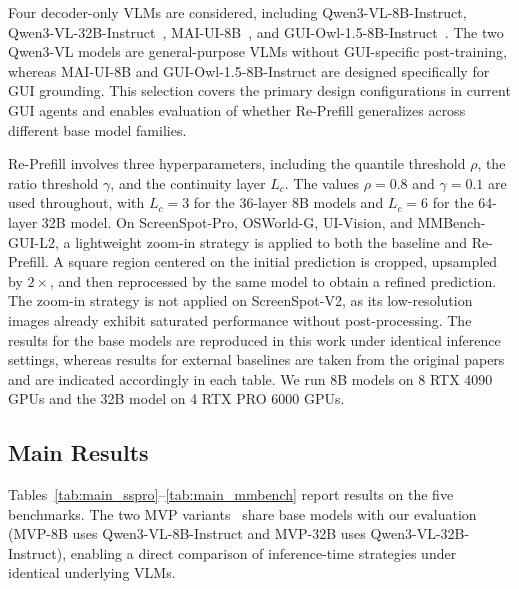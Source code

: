 \documentclass{article}
\begin{document}
Four decoder-only VLMs are considered, including Qwen3-VL-8B-Instruct, Qwen3-VL-32B-Instruct~\citep{qwen3vl}, MAI-UI-8B~\citep{maiui}, and GUI-Owl-1.5-8B-Instruct~\citep{guiowl}.
The two Qwen3-VL models are general-purpose VLMs without GUI-specific post-training, whereas MAI-UI-8B and GUI-Owl-1.5-8B-Instruct are designed specifically for GUI grounding.
This selection covers the primary design configurations in current GUI agents and enables evaluation of whether Re-Prefill generalizes across different base model families.

Re-Prefill involves three hyperparameters, including the quantile threshold $\rho$, the ratio threshold $\gamma$, and the continuity layer $L_c$.
The values $\rho = 0.8$ and $\gamma = 0.1$ are used throughout, with $L_c = 3$ for the 36-layer 8B models and $L_c = 6$ for the 64-layer 32B model.
On ScreenSpot-Pro, OSWorld-G, UI-Vision, and MMBench-GUI-L2, a lightweight zoom-in strategy is applied to both the baseline and Re-Prefill.
A square region centered on the initial prediction is cropped, upsampled by $2{\times}$, and then reprocessed by the same model to obtain a refined prediction.
The zoom-in strategy is not applied on ScreenSpot-V2, as its low-resolution images already exhibit saturated performance without post-processing.
The results for the base models are reproduced in this work under identical inference settings, whereas results for external baselines are taken from the original papers and are indicated accordingly in each table.
We run 8B models on 8 RTX 4090 GPUs and the 32B model on 4 RTX PRO 6000 GPUs.


\subsection{Main Results}
\label{sec:main_results}

Tables~\ref{tab:main_sspro}--\ref{tab:main_mmbench} report results on the five benchmarks.
The two MVP variants~\citep{mvp} share base models with our evaluation (MVP-8B uses Qwen3-VL-8B-Instruct and MVP-32B uses Qwen3-VL-32B-Instruct), enabling a direct comparison of inference-time strategies under identical underlying VLMs.




\end{document}

